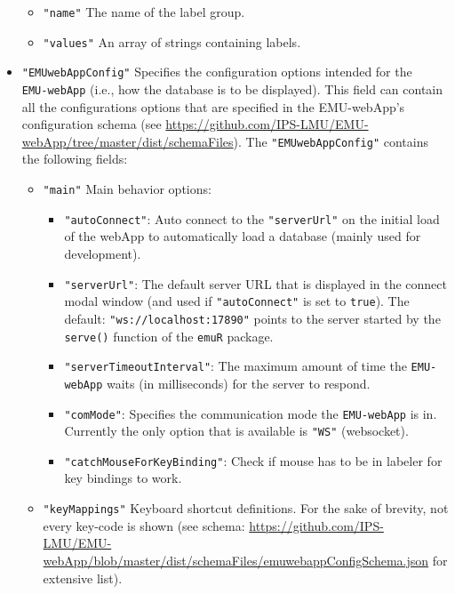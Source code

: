 \documentclass[]{book}
\theoremstyle{definition}
\theoremstyle{definition}
\theoremstyle{definition}
\theoremstyle{remark}
\begin{document}
\begin{itemize}
  \begin{itemize}
  \item
    \texttt{"name"} The name of the label group.
  \item
    \texttt{"values"} An array of strings containing labels.
  \end{itemize}
\item
  \texttt{"EMUwebAppConfig"} Specifies the configuration options
  intended for the\\
  \texttt{EMU-webApp} (i.e., how the database is to be displayed). This
  field can contain all the configurations options that are specified in
  the EMU-webApp's configuration schema (see
  \url{https://github.com/IPS-LMU/EMU-webApp/tree/master/dist/schemaFiles}).
  The \texttt{"EMUwebAppConfig"} contains the following fields:

  \begin{itemize}
  \item
    \texttt{"main"} Main behavior options:

    \begin{itemize}
    \item
      \texttt{"autoConnect"}: Auto connect to the \texttt{"serverUrl"}
      on the initial load of the webApp to automatically load a database
      (mainly used for development).
    \item
      \texttt{"serverUrl"}: The default server URL that is displayed in
      the connect modal window (and used if \texttt{"autoConnect"} is
      set to \texttt{true}). The default:
      \texttt{"ws://localhost:17890"} points to the server started by
      the \texttt{serve()} function of the \texttt{emuR} package.
    \item
      \texttt{"serverTimeoutInterval"}: The maximum amount of time the
      \texttt{EMU-webApp} waits (in milliseconds) for the server to
      respond.
    \item
      \texttt{"comMode"}: Specifies the communication mode the
      \texttt{EMU-webApp} is in. Currently the only option that is
      available is \texttt{"WS"} (websocket).
    \item
      \texttt{"catchMouseForKeyBinding"}: Check if mouse has to be in
      labeler for key bindings to work.
    \end{itemize}
  \item
    \texttt{"keyMappings"} Keyboard shortcut definitions. For the sake
    of brevity, not every key-code is shown (see schema:
    \url{https://github.com/IPS-LMU/EMU-webApp/blob/master/dist/schemaFiles/emuwebappConfigSchema.json}
    for extensive list).


\end{itemize}
\end{itemize}
\end{document}
